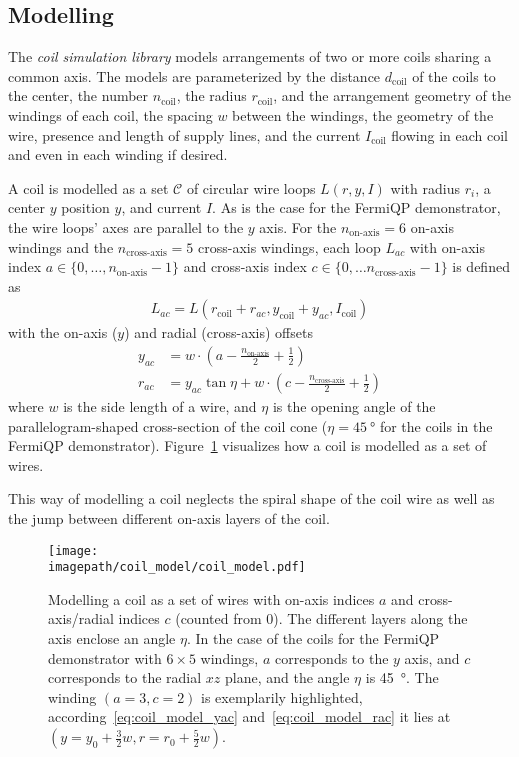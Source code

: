 \subsection*{Modelling}
The \textit{coil simulation library} models arrangements of two or more coils sharing a common axis. The models are parameterized by the distance $d_\text{coil}$ of the coils to the center, the number $n_\text{coil}$, the radius $r_\text{coil}$, and the arrangement geometry of the windings of each coil, the spacing $w$ between the windings, the geometry of the wire, presence and length of supply lines, and the current $I_\text{coil}$ flowing in each coil and even in each winding if desired.

A coil is modelled as a set $\mathcal{C}$ of circular wire loops $L(r, y, I)$ with radius $r_i$, a center $y$ position $y$, and current $I$. As is the case for the FermiQP demonstrator, the wire loops' axes are parallel to the $y$ axis. For the $n_\text{on-axis} = 6$ on-axis windings and the $n_\text{cross-axis} = 5$ cross-axis windings, each loop $L_{ac}$ with on-axis index $a \in \{0, \ldots, n_\text{on-axis} - 1\}$ and cross-axis index $c \in \{0, \ldots n_\text{cross-axis} - 1\}$ is defined as
\begin{align}
    L_{ac} = L \left(r_\text{coil} + r_{ac}, y_\text{coil} + y_{ac}, I_\text{coil}\right)
\end{align}
with the on-axis ($y$) and radial (cross-axis) offsets
\begin{align}
    \label{eq:coil_model_yac}
    y_{ac} &= w\cdot \left(a-\frac{n_\text{on-axis}}{2} + \frac{1}{2}\right) \\
    \label{eq:coil_model_rac}
    r_{ac} &= y_{ac} \tan \eta + w \cdot \left(c - \frac{n_\text{cross-axis}}{2} + \frac{1}{2}\right)
\end{align}
where $w$ is the side length of a wire, and $\eta$ is the opening angle of the parallelogram-shaped cross-section of the coil cone ($\eta = \SI{45}{\degree}$ for the coils in the FermiQP demonstrator). Figure~\ref{fig:coil_model} visualizes how a coil is modelled as a set of wires.

This way of modelling a coil neglects the spiral shape of the coil wire as well as the jump between different on-axis layers of the coil.

\begin{figure}
    \centering
    \texttt{[image: \\imagepath/coil\_model/coil\_model.pdf]}
    \caption{Modelling a coil as a set of wires with on-axis indices $a$ and cross-axis/radial indices $c$ (counted from $0$). The different layers along the axis enclose an angle $\eta$. In the case of the coils for the FermiQP demonstrator with $6 \times 5$ windings, $a$ corresponds to the $y$ axis, and $c$ corresponds to the radial $xz$ plane, and the angle $\eta$ is \SI[]{45}{\degree}. The winding $(a = 3, c=2)$ is exemplarily highlighted, according~\eqref{eq:coil_model_yac} and~\eqref{eq:coil_model_rac} it lies at $(y = y_0 + \frac{3}{2}w, r = r_0 + \frac{5}{2}w)$.}
    \label{fig:coil_model}
\end{figure}


